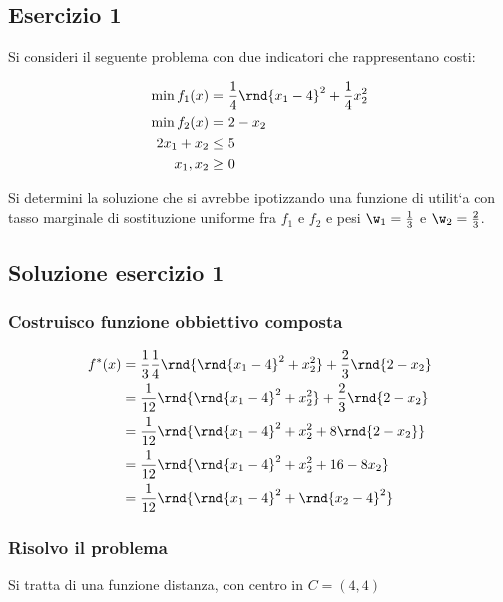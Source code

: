 \documentclass[\main/main.tex]{subfiles}
\begin{document}
\subsection{Esercizio 1}
Si consideri il seguente problema con due indicatori che rappresentano costi:

\begin{align*}
  \min f_1(x) & =\frac{1}{4}\rnd{x_1-4}^2 + \frac{1}{4}x_2^2 \\
  \min f_2(x) & = 2 -x_2                                     \\
  2x_1 + x_2  & \leq 5                                       \\
  x_1, x_2    & \geq 0
\end{align*}

Si determini la soluzione che si avrebbe ipotizzando una funzione di utilit`a con
tasso marginale di sostituzione uniforme fra $f_1$ e $f_2$ e pesi $\w_1 = \frac{1}{3}$ e $\w_2 = \frac{2}{3}$.

\subsection{Soluzione esercizio 1}

\subsubsection*{Costruisco funzione obbiettivo composta}

\begin{align*}
  f^*(x) & =\frac{1}{3}\frac{1}{4}\rnd{\rnd{x_1-4}^2 + x_2^2} + \frac{2}{3}\rnd{2-x_2} \\
         & = \frac{1}{12}\rnd{\rnd{x_1-4}^2 + x_2^2} + \frac{2}{3}\rnd{2-x_2}          \\
         & = \frac{1}{12}\rnd{\rnd{x_1-4}^2 + x_2^2 + 8\rnd{2-x_2}}                    \\
         & = \frac{1}{12}\rnd{\rnd{x_1-4}^2 + x_2^2 + 16-8x_2}                         \\
         & = \frac{1}{12}\rnd{\rnd{x_1-4}^2 + \rnd{x_2-4}^2}                           \\
\end{align*}

\subsubsection*{Risolvo il problema}

Si tratta di una funzione distanza, con centro in $C = (4,4)$
\end{document}
